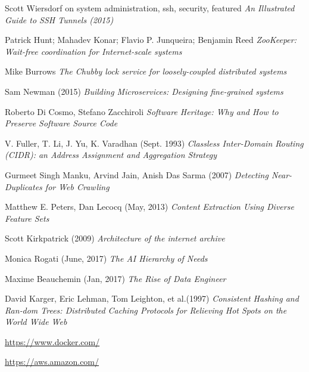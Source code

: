 \begin{thebibliography}{9}
Scott Wiersdorf on system administration, ssh, security, featured
\textit{An Illustrated Guide to SSH Tunnels (2015)}

Patrick Hunt; Mahadev Konar; Flavio P. Junqueira; Benjamin Reed
\textit{ZooKeeper: Wait-free coordination for Internet-scale systems}

Mike Burrows
\textit{The Chubby lock service for loosely-coupled distributed systems}

Sam Newman (2015)
\textit{Building Microservices: Designing fine-grained systems}

Roberto Di Cosmo, Stefano Zacchiroli
\textit{Software Heritage: Why and How to Preserve Software Source Code}

  V. Fuller, T. Li, J. Yu, K. Varadhan (Sept. 1993)
  \textit{Classless Inter-Domain Routing (CIDR): an Address Assignment and Aggregation Strategy}

  Gurmeet Singh Manku, Arvind Jain, Anish Das Sarma (2007)
  \textit{Detecting Near-Duplicates for Web Crawling}

  Matthew E. Peters, Dan Lecocq (May, 2013)
  \textit{Content Extraction Using Diverse Feature Sets}

  Scott Kirkpatrick (2009)
  \textit{Architecture of the internet archive}

  Monica Rogati (June, 2017)
  \textit{The AI Hierarchy of Needs}

  Maxime Beauchemin (Jan, 2017)
  \textit{The Rise of Data Engineer}

  David Karger, Eric Lehman, Tom Leighton, et al.(1997)
  \textit{Consistent Hashing and Ran‐dom Trees: Distributed Caching Protocols for Relieving Hot Spots on the World Wide Web}

\url{https://www.docker.com/}

\url{https://aws.amazon.com/}

\end{thebibliography}